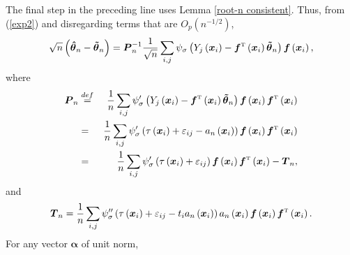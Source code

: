 \documentclass[times, authoryear, 12pt, twoside]{elsarticle}
\begin{document}
The final step in the preceding line uses Lemma  \ref{root-n consistent}. Thus, from (\ref{exp2}) and disregarding
terms that are $O_{p}\left( n^{-1/2}\right) $, 
\begin{equation}
\sqrt{n}\left( \boldsymbol{\hat{\theta}}_{n}-\boldsymbol{\tilde{\theta}}%
_{n}\right) =\boldsymbol{P}_{n}^{-1}\frac{1}{\sqrt{n}}\sum_{i,j}\psi
_{\sigma }\left( Y_{j}\left( \boldsymbol{x}_{i}\right) -\boldsymbol{f}^{{%
\mathrm{\scriptscriptstyle T}}}\left( \boldsymbol{x}_{i}\right) \boldsymbol{%
\tilde{\theta}}_{n}\right) \boldsymbol{f}\left( \boldsymbol{x}_{i}\right) ,
\label{exp3}
\end{equation}%
where%
\begin{eqnarray}
\boldsymbol{P}_{n} &\overset{def}{=}&\frac{1}{n}\sum_{i,j}\psi _{\sigma
}^{\prime }\left( Y_{j}\left( \boldsymbol{x}_{i}\right) -\boldsymbol{f}^{{%
\mathrm{\scriptscriptstyle T}}}\left( \boldsymbol{x}_{i}\right) \boldsymbol{%
\tilde{\theta}}_{n}\right) \boldsymbol{f}\left( \boldsymbol{x}_{i}\right) 
\boldsymbol{f}^{{\mathrm{\scriptscriptstyle T}}}\left( \boldsymbol{x}%
_{i}\right)   \notag \\
&=&\frac{1}{n}\sum_{i,j}\psi _{\sigma }^{\prime }\left( \tau \left( 
\boldsymbol{x}_{i}\right) +\varepsilon _{ij}-a_{n}\left( \boldsymbol{x}%
_{i}\right) \right) \boldsymbol{f}\left( \boldsymbol{x}_{i}\right) 
\boldsymbol{f}^{{\mathrm{\scriptscriptstyle T}}}\left( \boldsymbol{x}%
_{i}\right)   \notag \\
&=&\frac{1}{n}\sum_{i,j}\psi _{\sigma }^{\prime }\left( \tau \left( 
\boldsymbol{x}_{i}\right) +\varepsilon _{ij}\right) \boldsymbol{f}\left( 
\boldsymbol{x}_{i}\right) \boldsymbol{f}^{{\mathrm{\scriptscriptstyle T}}%
}\left( \boldsymbol{x}_{i}\right) -\boldsymbol{T}_{n},  \label{exp4}
\end{eqnarray}%
and
\begin{equation*}
\boldsymbol{T}_{n}=\frac{1}{n}\sum_{i,j}\psi _{\sigma }^{\prime \prime
}\left( \tau \left( \boldsymbol{x}_{i}\right) +\varepsilon
_{ij}-t_ia_{n}\left( \boldsymbol{x}_{i}\right) \right) a_{n}\left( \boldsymbol{%
x}_{i}\right) \boldsymbol{f}\left( \boldsymbol{x}_{i}\right) \boldsymbol{f}^{%
{\mathrm{\scriptscriptstyle T}}}\left( \boldsymbol{x}_{i}\right) .
\end{equation*}%
For any vector $\boldsymbol{\alpha }$ of unit norm, 
\end{document}
